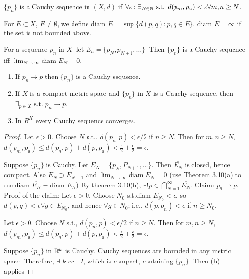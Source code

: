 \begin{definition}
	$\{p_n\}$ is a Cauchy sequence in $(X,d)$ if $\forall{\varepsilon}: \exists_{N \in \mathbb{N}} \text{ s.t. } d(p_{m},p_{n})<\varepsilon \forall m,n\ge N$.
\end{definition}
\begin{definition}
	\label{def:3.9}
	For $E \subset X$, $E \neq \emptyset$, we define $\text{diam } E=\sup{\{d(p,q): p,q \in E\}}$. $\text{diam } E=\infty$ if the set is not bounded above.
	\begin{example}
		For a sequence ${p_{n}}$ in $X$, let $E_{n}=\{p_N,p_{N+1},\ldots \}$. Then $\{p_{n}\}$ is a Cauchy sequence iff $\lim_{N\to \infty }{\text{diam }E_N}=0$.
	\end{example}

\end{definition}
\begin{theorem}
	\label{thm:3.11}
	\begin{enumerate}
		\item
		      \label{thm:3.11a}
		      If $p_{n}\to p$ then $\{p_{n}\} $ is a Cauchy sequence.
		\item If $X$ is a compact metric space and $\{p_{n}\}$ in $X$ is a Cauchy sequence, then $\exists_{p \in  X} \text{ s.t. } p_{n}\to p$.
		\item In $R^{K}$ every Cauchy sequence converges.
	\end{enumerate}
	\hfill
	\begin{proof}
		\item
		Let $\epsilon>0$. Choose $N$ s.t., $d(p_{n},p)<\epsilon/2$ if $n\ge N$. Then for $m,n\ge N$, $d(p_m,p_{n})\le d(p_{n},p)+d(p,p_n)<\frac{\epsilon}{2}+\frac{\epsilon}{2}=\epsilon$.
		\item
		Suppose $\{p_n\} $ is Cauchy. Let $E_{N}=\{p_{N},P_{N+1},\ldots \} $. Then $\overline{E_{N}}$ is closed, hence compact.
		Also $\overline{E_{N}} \supset \overline{E_{N+1}}$ and $\lim_{N\to \infty }{\text{diam }\overline{E_N}}=0$ (use Theorem 3.10(a) to see $\text{diam }\overline{E_N}=\text{diam }E_N $)
		By theorem 3.10(b), $\exists! {p \in \bigcap_{N=1}^{\infty } \overline{E_N}}$. Claim: $p_{n}\to p$.\\
		Proof of the claim: Let $\epsilon>0$. Choose $N_0$ s.t.diam $\overline{E_{N_0}}<\epsilon $, so $d(p,q)<\epsilon \forall g \in \overline{E_{N_0}}$, and hence $\forall{g \in N_0}$; i.e., $d(p,p_{n})<\epsilon$ if $n\ge N_0$.

		Let $\epsilon>0$. Choose $N$ s.t., $d(p_{n},p)<\epsilon/2$ if $n\ge N$. Then for $m,n\ge N$, $d(p_m,p_{n})\le d(p_{n},p)+d(p,p_n)<\frac{\epsilon}{2}+\frac{\epsilon}{2}=\epsilon$.
		\item Suppose $\{p_{n}\} $ in $\mathbb{R}^{k}$ is Cauchy. Cauchy sequences are bounded in any metric space. Therefore, $\exists$ $k$-cell $I$, which is compact, containing $\{p_{n}\}$. Then (b) applies
	\end{proof}

\end{theorem}
